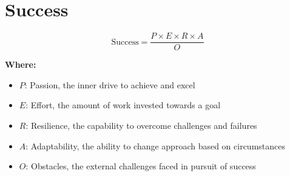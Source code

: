 \chapter{Success}

\begin{equation}
\text{Success} = \frac{P \times E \times R \times A}{O}
\end{equation}

\textbf{Where:}

\begin{itemize}
    \item $P$: Passion, the inner drive to achieve and excel
    \item $E$: Effort, the amount of work invested towards a goal
    \item $R$: Resilience, the capability to overcome challenges and failures
    \item $A$: Adaptability, the ability to change approach based on circumstances
    \item $O$: Obstacles, the external challenges faced in pursuit of success
\end{itemize}